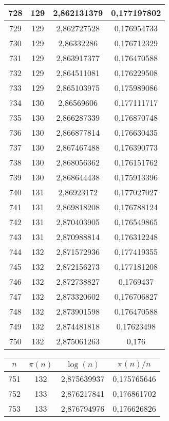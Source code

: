 {\begin{minipage}[!h]{0.45\textwidth}
\begin{longtable}{cccc}
728 & 129 & 2,862131379 & 0,177197802 \\ \hline
729 & 129 & 2,862727528 & 0,176954733 \\ \hline
730 & 129 & 2,86332286 & 0,176712329 \\ \hline
731 & 129 & 2,863917377 & 0,176470588 \\ \hline
732 & 129 & 2,864511081 & 0,176229508 \\ \hline
733 & 129 & 2,865103975 & 0,175989086 \\ \hline
734 & 130 & 2,86569606 & 0,177111717 \\ \hline
735 & 130 & 2,866287339 & 0,176870748 \\ \hline
736 & 130 & 2,866877814 & 0,176630435 \\ \hline
737 & 130 & 2,867467488 & 0,176390773 \\ \hline
738 & 130 & 2,868056362 & 0,176151762 \\ \hline
739 & 130 & 2,868644438 & 0,175913396 \\ \hline
740 & 131 & 2,86923172 & 0,177027027 \\ \hline
741 & 131 & 2,869818208 & 0,176788124 \\ \hline
742 & 131 & 2,870403905 & 0,176549865 \\ \hline
743 & 131 & 2,870988814 & 0,176312248 \\ \hline
744 & 132 & 2,871572936 & 0,177419355 \\ \hline
745 & 132 & 2,872156273 & 0,177181208 \\ \hline
746 & 132 & 2,872738827 & 0,1769437 \\ \hline
747 & 132 & 2,873320602 & 0,176706827 \\ \hline
748 & 132 & 2,873901598 & 0,176470588 \\ \hline
749 & 132 & 2,874481818 & 0,17623498 \\ \hline
750 & 132 & 2,875061263 & 0,176 \\ \hline
\end{longtable}
\end{minipage}
\begin{minipage}[!h]{0.45\textwidth}\centering
\tiny
\begin{longtable}{cccc} \hline
\(n\) & \(\pi(n)\) & \(\log(n)\) & \(\pi(n)/n\) \\ \hline
751 & 132 & 2,875639937 & 0,175765646 \\ \hline
752 & 133 & 2,876217841 & 0,176861702 \\ \hline
753 & 133 & 2,876794976 & 0,176626826 \\ \hline

\end{longtable}
\end{minipage}}
